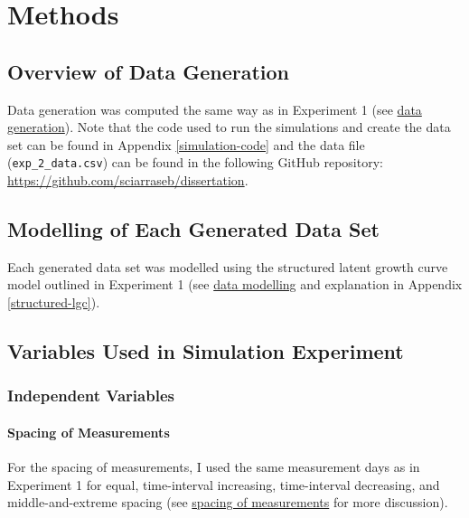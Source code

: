 \documentclass[
12pt, %
twoside,
english]{guelphthesis}
\begin{document}
\hypertarget{methods-1}{%
\section{Methods}\label{methods-1}}

\hypertarget{overview-of-data-generation}{%
\subsection{Overview of Data Generation}\label{overview-of-data-generation}}

Data generation was computed the same way as in Experiment 1 (see \protect\hyperlink{data-generation}{data generation}). Note that the code used to run the simulations and create the data set can be found in Appendix \ref{simulation-code} and the data file (\texttt{exp\_2\_data.csv}) can be found in the following GitHub repository: \url{https://github.com/sciarraseb/dissertation}.

\hypertarget{data-modelling-exp2}{%
\subsection{Modelling of Each Generated Data Set}\label{data-modelling-exp2}}

Each generated data set was modelled using the structured latent growth curve model outlined in Experiment 1 (see \protect\hyperlink{data-modelling}{data modelling} and explanation in Appendix \ref{structured-lgc}).

\hypertarget{variables-used-in-simulation-experiment-1}{%
\subsection{Variables Used in Simulation Experiment}\label{variables-used-in-simulation-experiment-1}}

\hypertarget{independent-variables-1}{%
\subsubsection{Independent Variables}\label{independent-variables-1}}

\hypertarget{spacing-of-measurements-1}{%
\paragraph{Spacing of Measurements}\label{spacing-of-measurements-1}}

For the spacing of measurements, I used the same measurement days as in Experiment 1 for equal, time-interval increasing, time-interval decreasing, and middle-and-extreme spacing (see \protect\hyperlink{spacing-measurements}{spacing of measurements} for more discussion).
\end{document}
